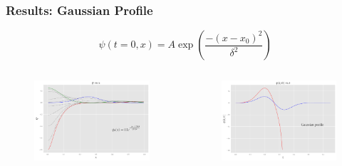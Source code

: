 \documentclass[hyperref={bookmarks=false},aspectratio=169]{beamer}
\begin{document}
\begin{frame}
    \frametitle{Results: Gaussian Profile}

    \begin{equation*}
        \psi(t=0, x)=A \exp \left(\frac{-\left(x-x_{0}\right)^{2}}{\delta^{2}}\right)
    \end{equation*}

    \begin{columns}
        \begin{figure}
            \centering
            \includegraphics[width=1\linewidth]{images/super_Gaussian.pdf}
        \end{figure}
        \begin{figure}
            \centering
            \includegraphics[width=1\linewidth]{images/at0_Gaussian.pdf}
        \end{figure}
    \end{columns}

\end{frame}
\end{document}
